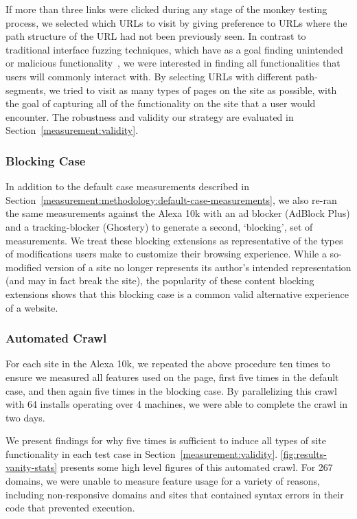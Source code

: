 If more than three links were clicked during any stage of the monkey testing
process, we selected which URLs to visit by  giving preference to URLs where
the path structure of the URL had not been previously seen. In contrast to
traditional interface fuzzing techniques, which have as a goal finding unintended
or malicious functionality~\cite{amalfitano2012using,liu2014decaf}, we were
interested in finding all functionalities that users will commonly interact
with.  By selecting URLs with different path-segments, we tried to visit as many
types of pages on the site as possible, with the goal of
capturing all of the functionality on the site that a user would encounter.
The robustness and validity our strategy are evaluated in
Section~\ref{measurement:validity}.



\subsubsection{Blocking Case}
\label{measurement:methodology:blocking-case-measurements}
In addition to the default case measurements described in
Section~\ref{measurement:methodology:default-case-measurements}, we also re-ran the same measurements
against the Alexa 10k with an ad blocker (AdBlock Plus) and a tracking-blocker
(Ghostery) to generate a second, `blocking', set of measurements. We treat
these blocking extensions as representative of the types of modifications
users make to customize their browsing experience. While a so-modified version of a site
no longer represents its author's intended representation (and may in fact
break the site), the popularity of these content blocking extensions shows that
this blocking case is a common valid alternative experience of a website.


\subsubsection{Automated Crawl}
\label{measurement:methodology:automated-crawl}



For each site in the Alexa 10k, we repeated the above procedure ten times
to ensure we measured all features used on the page, first five times in the
default case, and then again five times in the blocking case.  By parallelizing this
crawl with 64 \FF installs operating over 4 machines, we were able to complete the crawl in
two days.

We present findings for why
five times is sufficient to induce all types of site functionality in each test case in
Section~\ref{measurement:validity}.  \ref{fig:results-vanity-stats} presents
some high level figures of this automated crawl.  For 267 domains,
we were unable to measure feature usage for a variety of reasons, including
non-responsive domains and sites that contained syntax errors in
their \JS code that prevented execution.